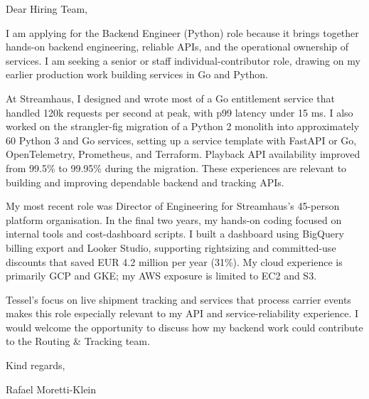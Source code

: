 \documentclass[11pt,a4paper]{article}
\begin{document}
Dear Hiring Team,

I am applying for the Backend Engineer (Python) role because it brings together hands-on backend engineering, reliable APIs, and the operational ownership of services. I am seeking a senior or staff individual-contributor role, drawing on my earlier production work building services in Go and Python.

At Streamhaus, I designed and wrote most of a Go entitlement service that handled 120k requests per second at peak, with p99 latency under 15 ms. I also worked on the strangler-fig migration of a Python 2 monolith into approximately 60 Python 3 and Go services, setting up a service template with FastAPI or Go, OpenTelemetry, Prometheus, and Terraform. Playback API availability improved from 99.5\% to 99.95\% during the migration. These experiences are relevant to building and improving dependable backend and tracking APIs.

My most recent role was Director of Engineering for Streamhaus’s 45-person platform organisation. In the final two years, my hands-on coding focused on internal tools and cost-dashboard scripts. I built a dashboard using BigQuery billing export and Looker Studio, supporting rightsizing and committed-use discounts that saved EUR 4.2 million per year (31\%). My cloud experience is primarily GCP and GKE; my AWS exposure is limited to EC2 and S3.

Tessel’s focus on live shipment tracking and services that process carrier events makes this role especially relevant to my API and service-reliability experience. I would welcome the opportunity to discuss how my backend work could contribute to the Routing & Tracking team.

Kind regards,

Rafael Moretti-Klein
\end{document}
